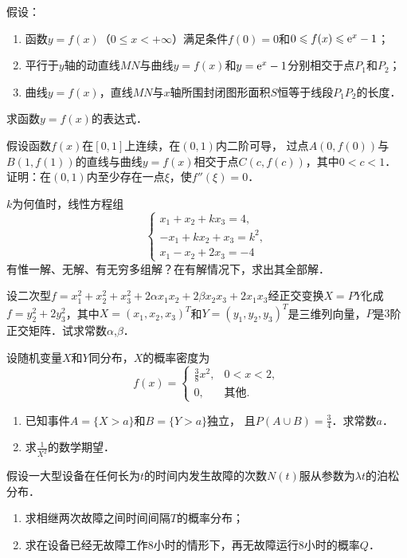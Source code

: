 \documentclass[plain,noanswer,medmath]{../../template/jnuexam}
\begin{document}

\begin{problem}
假设：
\begin{enumerate}
\item 函数$y = f(x)$（$0 \le x < +\infty$）满足条件$f(0) = 0$和$0 \leqslant f(x) \leqslant \mathrm{e}^x - 1$；
\item 平行于$y$轴的动直线$MN$与曲线$y = f(x)$和$y = \mathrm{e}^x - 1$分别相交于点$P_1$和$P_2$；
\item 曲线$y = f(x)$，直线$MN$与$x$轴所围封闭图形面积$S$恒等于线段$P_1P_2$的长度．
\end{enumerate}
求函数$y = f(x)$的表达式．
\end{problem}



\begin{problem}
假设函数$f(x)$在$[0,1]$上连续，在$(0,1)$内二阶可导，
过点$A(0,f(0))$与$B(1,f(1))$的直线与曲线$y = f(x)$相交于点$C(c,f(c))$，其中$0 < c < 1$．
证明：在$(0,1)$内至少存在一点$\xi$，使$f''(\xi) = 0$．
\end{problem}



\begin{problem}
$k$为何值时，线性方程组
$$\begin{cases}
  x_1 + x_2 + kx_3 = 4, \\
  -x_1 + kx_2 + x_3 = k^2, \\
  x_1 - x_2 + 2x_3 = - 4
\end{cases}$$
有惟一解、无解、有无穷多组解？在有解情况下，求出其全部解．
\end{problem}



\begin{problem}
设二次型$f = x_1^2+ x_2^2+ x_3^2+ 2\alpha x_1x_2 + 2\beta x_2x_3 + 2x_1x_3$经正交变换$X = PY$化成$f = y_2^2+ 2y_3^2$，其中$X = (x_1,x_2,x_3)^T$和$Y = (y_1,y_2,y_3)^T$是三维列向量，$P$是$3$阶正交矩阵．试求常数$\alpha$,$\beta$．
\end{problem}



\begin{problem}
设随机变量$X$和$Y$同分布，$X$的概率密度为
$$f(x) = \begin{cases}
  \frac{3}{8}x^2, & 0 < x < 2, \\
               0, & \text{其他}.
\end{cases}$$
\begin{enumerate}
\item 已知事件$A = \{X > a\}$和$B = \{Y > a\}$独立，
      且$P\left(A \cup B \right) = \frac{3}{4}$．求常数$a$．
\item 求$\frac{1}{X^2}$的数学期望．
\end{enumerate}
\end{problem}



\begin{problem}
假设一大型设备在任何长为$t$的时间内发生故障的次数$N(t)$服从参数为$\lambda t$的泊松分布．
\begin{enumerate}
\item 求相继两次故障之间时间间隔$T$的概率分布；
\item 求在设备已经无故障工作$8$小时的情形下，再无故障运行$8$小时的概率$Q$．
\end{enumerate}
\end{problem}
\end{document}
